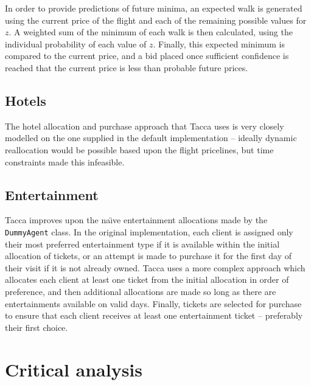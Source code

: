 \documentclass[oribibl]{llncs}
\begin{document}
In order to provide predictions of future minima, an expected walk is generated using the current price of the flight and each of the remaining possible values for $z$. A weighted sum of the minimum of each walk is then calculated, using the individual probability of each value of $z$. Finally, this expected minimum is compared to the current price, and a bid placed once sufficient confidence is reached that the current price is less than probable future prices.

\subsection{Hotels}
The hotel allocation and purchase approach that Tacca uses is very closely modelled on the one supplied in the default implementation -- ideally dynamic reallocation would be possible based upon the flight pricelines, but time constraints made this infeasible.

\subsection{Entertainment}
Tacca improves upon the na\"{\i}ve entertainment allocations made by the \texttt{DummyAgent} class. In the original implementation, each client is assigned only their most preferred entertainment type if it is available within the initial allocation of tickets, or an attempt is made to purchase it for the first day of their visit if it is not already owned. Tacca uses a more complex approach which allocates each client at least one ticket from the initial allocation in order of preference, and then additional allocations are made so long as there are entertainments available on valid days. Finally, tickets are selected for purchase to ensure that each client receives at least one entertainment ticket -- preferably their first choice.

\section{Critical analysis}
\end{document}
